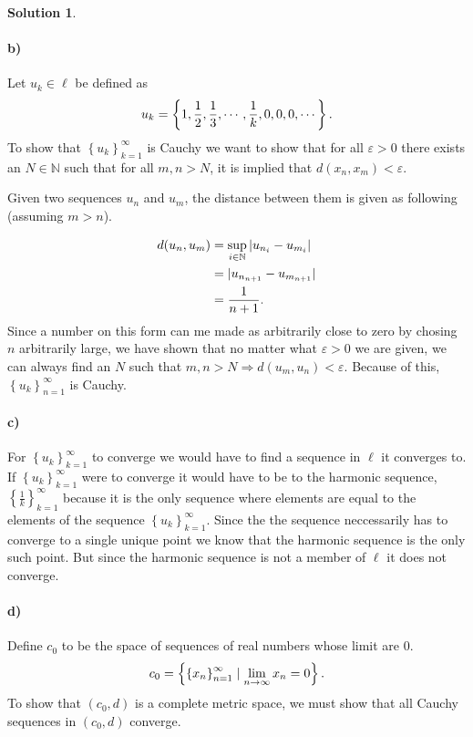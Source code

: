 \documentclass[a4paper]{article}
\theoremstyle{definition}
\newtheorem{sol}{Solution}
\begin{document}
\begin{sol}
\paragraph{b)}
Let $u_k \in \ell$ be defined as
\begin{equation}
  \notag
  u_k = \left\{ 1, \frac{1}{2}, \frac{1}{3}, \cdots, \frac{1}{k}, 0, 0, 0, \cdots \right\}.
\end{equation}
To show that $\left\{ u_k \right\}_{ k = 1 }^{\infty}$ is Cauchy we want to
show that for all $\varepsilon > 0$ there exists an $N \in \mathbb{N}$ such
that for all $m, n > N$, it is implied that $d\left( x_n, x_m \right) <
\varepsilon$.

Given two sequences $u_n$ and $u_m$, the distance between them is given as
following (assuming $m > n$).

\begin{align*}
  \notag
  d(u_n, u_m) &= \sup_{i\in\mathbb{N}}\left| u_{n_{i}} - u_{m_{i}} \right| \\ 
              &= | u_{n_{n+1}} - u_{m_{n+1}} | \\
              &= \frac{1}{n+1}.
\end{align*}
Since a number on this form can me made as arbitrarily close to zero by chosing
$n$ arbitrarily large, we have shown that no matter what $\varepsilon > 0$ we
are given, we can always find an $N$ such that $m, n > N \Longrightarrow d(u_m,
u_n) < \varepsilon$. Because of this, $\left\{ u_k \right\}_{n=1}^{\infty}$ is
Cauchy.

\paragraph{c)}

For $\left\{ u_k \right\}_{k=1}^{\infty}$ to converge we would have to find a
sequence in $\ell$ it converges to. If $\left\{ u_k \right\}_{k=1}^{\infty}$
were to converge it would have to be to the harmonic sequence, $\left\{
\frac{1}{k} \right\}_{k=1}^{\infty}$ because it is the only sequence where
elements are equal to the elements of the sequence $\left\{ u_k
\right\}_{k=1}^{\infty}$. Since the the sequence neccessarily has to converge
to a single unique point we know that the harmonic sequence is the only such
point. But since the harmonic sequence is not a member of $\ell$ it does not
converge.

\paragraph{d)}
Define $c_0$ to be the space of sequences of real numbers whose limit are 0.
\begin{equation}
  \notag
  c_{0} = \left\{ \left\{ x_n \right\}_{n=1}^{\infty} \mid \lim\limits_{n\rightarrow\infty} x_n = 0 \right\}.
\end{equation}
To show that $\left( c_0, d \right)$ is a complete metric space, we must show
that all Cauchy sequences in $\left( c_0, d \right)$ converge.


\end{sol}
\end{document}
